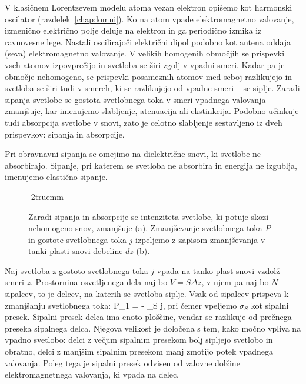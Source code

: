 V klasičnem Lorentzevem modelu atoma vezan elektron opišemo kot harmonski 
oscilator (razdelek~\ref{chap:lomni}). Ko na atom vpade
elektromagnetno valovanje, izmenično električno polje deluje na elektron in 
ga periodično izmika iz ravnovesne lege. Nastali oscilirajoči električni dipol 
podobno kot antena oddaja (seva) elektromagnetno valovanje. V velikih 
homogenih območjih se prispevki vseh atomov izpovprečijo in svetloba
se širi zgolj v vpadni smeri. Kadar pa je območje nehomogeno, se 
prispevki posameznih atomov med seboj
razlikujejo in svetloba se širi tudi v smereh, ki 
se razlikujejo od vpadne smeri -- se siplje. 
Zaradi sipanja svetlobe se gostota svetlobnega toka v smeri vpadnega valovanja
zmanjšuje, kar imenujemo slabljenje, atenuacija ali ekstinkcija. Podobno učinkuje tudi 
absorpcija svetlobe v snovi, zato je celotno slabljenje sestavljeno iz dveh 
prispevkov: sipanja in absorpcije. 

Pri obravnavni sipanja se omejimo na dielektrične snovi, 
ki svetlobe ne absorbirajo. Sipanje, pri katerem se svetloba ne absorbira
in energija ne izgublja, imenujemo elastično sipanje.
\begin{figure}[!h]
\centering
\def\svgwidth{120truemm} 

\caption{Zaradi sipanja in absorpcije se intenziteta svetlobe, ki potuje skozi 
nehomogeno snov, zmanjšuje (a). Zmanjševanje svetlobnega toka $P$ in 
gostote svetlobnega toka $j$ izpeljemo z zapisom
zmanjševanja v tanki plasti snovi debeline $dz$ (b).}
\label{fig:07_skica}
\vglue-2truemm
\end{figure}

Naj svetloba z gostoto svetlobnega toka $j$ vpada na tanko plast snovi 
vzdolž smeri $z$. Prostornina osvetljenega dela naj bo $V = S \Delta z$,
v njem pa naj bo $N$ sipalcev, to je delcev, na katerih se svetloba siplje. 
Vsak od sipalcev prispeva k zmanjšanju svetlobnega toka:
\beq
\Delta P_1 = - \sigma_S j,
\label{eq:07_01}
\eeq
pri čemer vpeljemo $\sigma_S$ kot sipalni presek. Sipalni presek delca ima
enoto ploščine, vendar se razlikuje od prečnega preseka sipalnega delca.
Njegova velikost je določena s tem, kako močno vpliva na vpadno 
svetlobo: delci z večjim sipalnim presekom bolj sipljejo svetlobo in obratno, 
delci z manjšim sipalnim presekom manj zmotijo potek vpadnega valovanja.
Poleg tega je sipalni presek odvisen od valovne dolžine elektromagnetnega valovanja, 
ki vpada na delec. 

